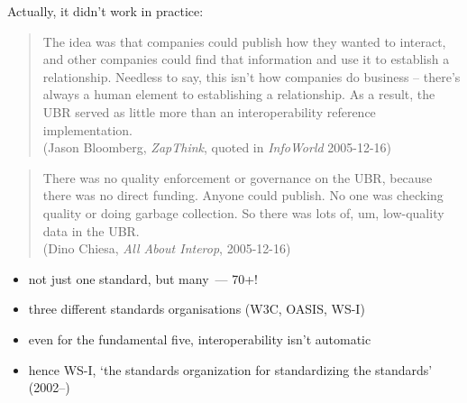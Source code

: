 \documentclass{sepslide-soa-faked} %
\begin{document}
\begin{slide}
Actually, it didn't work in practice:
\begin{quote} 
{\sffamily
The idea was that companies could publish how they wanted to interact, and other companies could find that information and use it to establish a relationship.
Needless to say, this isn't how companies do business -- there's always a human element to establishing a relationship. As a result, the UBR served as little more than an interoperability reference implementation. 
} \medskip \\
(Jason Bloomberg, \textit{ZapThink}, quoted in \textit{InfoWorld} 2005-12-16)
\end{quote}
\bigskip
\begin{quote} 
{\sffamily
There was no quality enforcement or governance on the UBR, because there was no direct funding.  Anyone could publish.  No one was checking quality or doing garbage collection.  So there was lots of, um, low-quality data in the UBR.
} \medskip \\
(Dino Chiesa, \textit{All About Interop}, 2005-12-16)
\end{quote}
\end{slide}

\begin{slide}
\begin{itemize}
\item not just one standard, but many~--- 70+!
\item three different standards organisations (W3C, OASIS, WS-I)
\item even for the fundamental five, interoperability isn't automatic
\item hence WS-I, `the standards organization for standardizing the standards' (2002--)
\end{itemize}
\end{slide}
\end{document}
